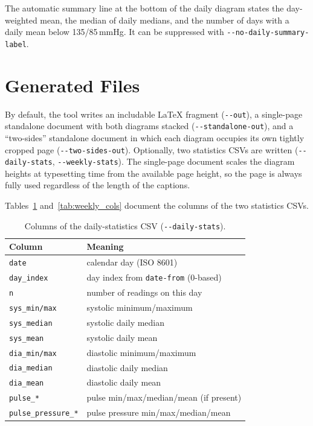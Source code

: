 \documentclass[conference]{IEEEtran}
\newcommand{\param}[1]{\texttt{#1}}
\begin{document}
The automatic summary line at the bottom of the daily diagram states the
day-weighted mean, the median of daily medians, and the number of days with a
daily mean below 135/85\,mmHg. It can be suppressed with
\param{-{}-no-daily-summary-label}.

\section{Generated Files}
By default, the tool writes an includable LaTeX fragment (\param{-{}-out}), a
single-page standalone document with both diagrams stacked
(\param{-{}-standalone-out}), and a ``two-sides'' standalone document in which
each diagram occupies its own tightly cropped page (\param{-{}-two-sides-out}).
Optionally, two statistics CSVs are written (\param{-{}-daily-stats},
\param{-{}-weekly-stats}). The single-page document scales the diagram heights at
typesetting time from the available page height, so the page is always fully
used regardless of the length of the captions.

Tables~\ref{tab:daily_cols} and~\ref{tab:weekly_cols} document the columns of the
two statistics CSVs.

\begin{table}[!t]
\caption{Columns of the daily-statistics CSV (\texttt{-{}-daily-stats}).}
\label{tab:daily_cols}
\centering
\footnotesize
\renewcommand{\arraystretch}{1.15}
\begin{tabular}{>{\raggedright\arraybackslash}p{} >{\raggedright\arraybackslash}p{}}
\toprule
\textbf{Column} & \textbf{Meaning} \\
\midrule
\texttt{date} & calendar day (ISO 8601) \\
\texttt{day\_index} & day index from \texttt{date-from} (0-based) \\
\texttt{n} & number of readings on this day \\
\texttt{sys\_min/max} & systolic minimum/maximum \\
\texttt{sys\_median} & systolic daily median \\
\texttt{sys\_mean} & systolic daily mean \\
\texttt{dia\_min/max} & diastolic minimum/maximum \\
\texttt{dia\_median} & diastolic daily median \\
\texttt{dia\_mean} & diastolic daily mean \\
\texttt{pulse\_*} & pulse min/max/median/mean (if present) \\
\texttt{pulse\_pressure\_*} & pulse pressure min/max/median/mean \\
\bottomrule
\end{tabular}
\end{table}
\end{document}
